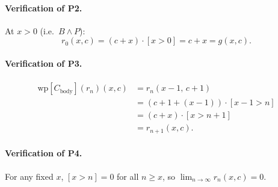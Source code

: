 \documentclass[acmsmall,natbib,review,screen,anonymous,10pt]{acmart}
\begin{document}
\paragraph{Verification of P2.}
At $x>0$ (i.e.\ $B\land P$):
\[
  r_0(x,c) = (c+x)\cdot[x>0] = c+x = g(x,c).
\]

\paragraph{Verification of P3.}
\begin{align*}
  \mathrm{wp}[C_{\text{body}}](r_n)(x,c)
    &= r_n(x-1,\,c+1) \\
    &= (c+1+(x-1))\cdot[x-1>n] \\
    &= (c+x)\cdot[x>n+1] \\
    &= r_{n+1}(x,c).
\end{align*}

\paragraph{Verification of P4.}
For any fixed $x$, $[x>n]=0$ for all $n\geq x$, so
$\lim_{n\to\infty} r_n(x,c) = 0$.

% 
\end{document}
